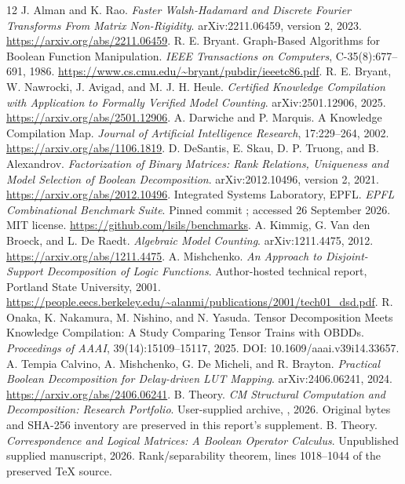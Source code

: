 \begin{thebibliography}{12}
 J. Alman and K. Rao. \emph{Faster Walsh-Hadamard and Discrete Fourier Transforms From Matrix Non-Rigidity}. arXiv:2211.06459, version 2, 2023. \url{https://arxiv.org/abs/2211.06459}.
 R. E. Bryant. Graph-Based Algorithms for Boolean Function Manipulation. \emph{IEEE Transactions on Computers}, C-35(8):677--691, 1986. \url{https://www.cs.cmu.edu/~bryant/pubdir/ieeetc86.pdf}.
 R. E. Bryant, W. Nawrocki, J. Avigad, and M. J. H. Heule. \emph{Certified Knowledge Compilation with Application to Formally Verified Model Counting}. arXiv:2501.12906, 2025. \url{https://arxiv.org/abs/2501.12906}.
 A. Darwiche and P. Marquis. A Knowledge Compilation Map. \emph{Journal of Artificial Intelligence Research}, 17:229--264, 2002. \url{https://arxiv.org/abs/1106.1819}.
 D. DeSantis, E. Skau, D. P. Truong, and B. Alexandrov. \emph{Factorization of Binary Matrices: Rank Relations, Uniqueness and Model Selection of Boolean Decomposition}. arXiv:2012.10496, version 2, 2021. \url{https://arxiv.org/abs/2012.10496}.
 Integrated Systems Laboratory, EPFL. \emph{EPFL Combinational Benchmark Suite}. Pinned commit ; accessed 26 September 2026. MIT license. \url{https://github.com/lsils/benchmarks}.
 A. Kimmig, G. Van den Broeck, and L. De Raedt. \emph{Algebraic Model Counting}. arXiv:1211.4475, 2012. \url{https://arxiv.org/abs/1211.4475}.
 A. Mishchenko. \emph{An Approach to Disjoint-Support Decomposition of Logic Functions}. Author-hosted technical report, Portland State University, 2001. \url{https://people.eecs.berkeley.edu/~alanmi/publications/2001/tech01_dsd.pdf}.
 R. Onaka, K. Nakamura, M. Nishino, and N. Yasuda. Tensor Decomposition Meets Knowledge Compilation: A Study Comparing Tensor Trains with OBDDs. \emph{Proceedings of AAAI}, 39(14):15109--15117, 2025. DOI: 10.1609/aaai.v39i14.33657.
 A. Tempia Calvino, A. Mishchenko, G. De Micheli, and R. Brayton. \emph{Practical Boolean Decomposition for Delay-driven LUT Mapping}. arXiv:2406.06241, 2024. \url{https://arxiv.org/abs/2406.06241}.
 B. Theory. \emph{CM Structural Computation and Decomposition: Research Portfolio}. User-supplied archive, , 2026. Original bytes and SHA-256 inventory are preserved in this report's supplement.
 B. Theory. \emph{Correspondence and Logical Matrices: A Boolean Operator Calculus}. Unpublished supplied manuscript, 2026. Rank/separability theorem, lines 1018--1044 of the preserved TeX source.
\end{thebibliography}
